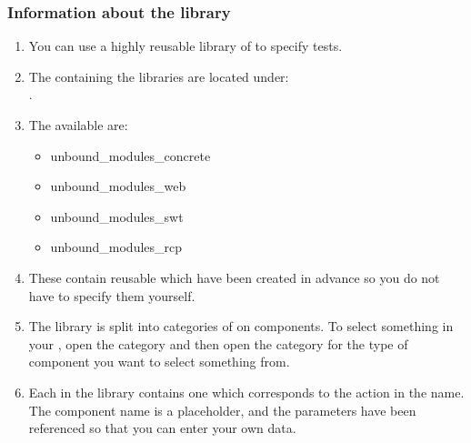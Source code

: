 \subsubsection{Information about the library}
\label{LibraryInformation}
\begin{enumerate}
\item You can use a  highly reusable library of \gdcases{} to specify tests. 
\item The \gdprojects{} containing the \gdcase{} libraries are located under:\\
.

\item The \gdprojects{} available are:
\begin{itemize}
\item unbound\_modules\_concrete
\item unbound\_modules\_web
\item unbound\_modules\_swt
\item unbound\_modules\_rcp
\end{itemize}

\item These \gdprojects{} contain reusable \gdcases{} which have been created in advance so you do not have to specify them yourself.
\item The library is split into categories of  on components. To select something in your \gdaut{}, open the  category and then open the category for the type of component you want to select something from. 

\item Each \gdcase{} in the library contains one \gdstep{} which corresponds to the action in the \gdcase{} name. The component name is a placeholder, and the parameters have been referenced so that you can enter your own data. 

 



\end{enumerate}

